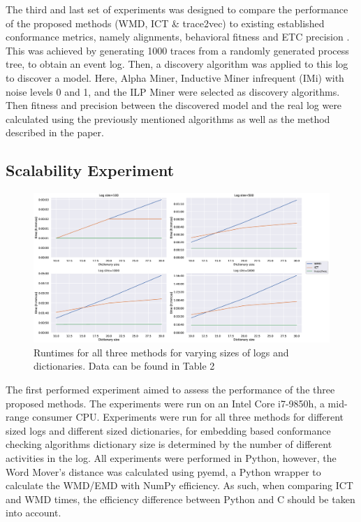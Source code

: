 \documentclass[runningheads]{template/llncs}
\begin{document}
The third and last set of experiments was designed to compare the performance of the proposed methods (WMD, ICT \& trace2vec) to existing established conformance metrics, namely alignments, behavioral fitness \cite{GMVB09} and ETC precision \cite{MuCa10}.
This was achieved by generating 1000 traces from a randomly generated process tree, to obtain an event log.
Then, a discovery algorithm was applied to this log to discover a model. Here, Alpha Miner, Inductive Miner infrequent (IMi) with noise levels 0 and 1, and the ILP Miner were selected as discovery algorithms.
Then fitness and precision between the discovered model and the real log were calculated using the previously mentioned algorithms as well as the method described in the paper.

\color{blue}
\subsection{Scalability Experiment}
\begin{figure}
	\includegraphics[width=1\textwidth]{figures/scaling}
	\caption{Runtimes for all three methods for varying sizes of logs and dictionaries. Data can be found in \cite{MuCa10} Table 2}
	\label{fig:scalability}
\end{figure}
The first performed experiment aimed to assess the performance  of the three proposed methods.
The experiments were run on an Intel Core i7-9850h, a mid-range consumer CPU.
Experiments were run for all three methods for different sized logs and different sized dictionaries, for embedding based conformance checking algorithms dictionary size is determined by the number of different activities in the log.
All experiments were performed in Python, however, the Word Mover's distance was calculated using pyemd, a Python wrapper to calculate the WMD/EMD with NumPy efficiency.
As such, when comparing ICT and WMD times, the efficiency difference between Python and C should be taken into account.
\end{document}
